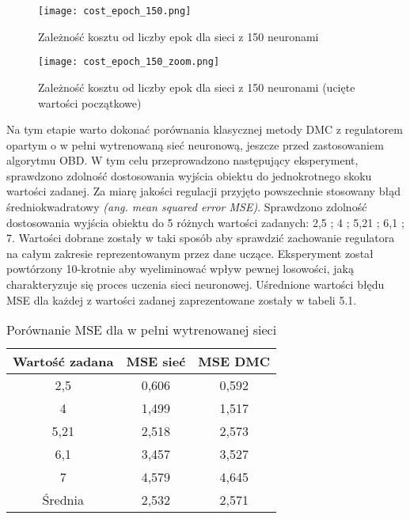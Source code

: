 \begin{figure}[!h]
  \label{fig:Koszt-liczba-epok}
  \centering \texttt{[image: cost\_epoch\_150.png]}
  \caption{Zależność kosztu od liczby epok dla sieci z 150 neuronami}
\end{figure}

\begin{figure}[!h]
  \label{fig:Koszt-liczba-epok-zoom}
  \centering \texttt{[image: cost\_epoch\_150\_zoom.png]}
  \caption{Zależność kosztu od liczby epok dla sieci z 150 neuronami (ucięte wartości początkowe)}
\end{figure}

\par Na tym etapie warto dokonać porównania klasycznej metody DMC z regulatorem opartym o w pełni wytrenowaną sieć neuronową, jeszcze przed zastosowaniem algorytmu OBD. W tym celu przeprowadzono następujący eksperyment, sprawdzono zdolność dostosowania wyjścia obiektu do jednokrotnego skoku wartości zadanej. Za miarę jakości regulacji przyjęto powszechnie stosowany błąd średniokwadratowy \emph{(ang. mean squared error MSE)}. Sprawdzono zdolność dostosowania wyjścia obiektu do 5 różnych wartości zadanych: 2,5 ; 4 ; 5,21 ; 6,1 ; 7. Wartości dobrane zostały w taki sposób aby sprawdzić zachowanie regulatora na całym zakresie reprezentowanym przez dane uczące. Eksperyment został powtórzony 10-krotnie aby wyeliminować wpływ pewnej losowości, jaką charakteryzuje się proces uczenia sieci neuronowej. Uśrednione wartości błędu MSE dla każdej z wartości zadanej zaprezentowane zostały w tabeli 5.1.
\begin{table}[!h] \label{tab:tabela1} \centering
\caption{Porównanie MSE dla w pełni wytrenowanej sieci}
\begin{tabular} {| c | c | c |} \hline
    Wartość zadana & MSE sieć & MSE DMC \\ \hline\hline
    2,5 & 0,606 & 0,592 \\ \hline
    4 & 1,499 & 1,517 \\ \hline
    5,21 & 2,518 & 2,573 \\ \hline
    6,1 & 3,457 & 3,527 \\ \hline
    7 & 4,579 & 4,645 \\ \hline
    Średnia & 2,532 & 2,571 \\ \hline
    
\end{tabular}
\end{table}
